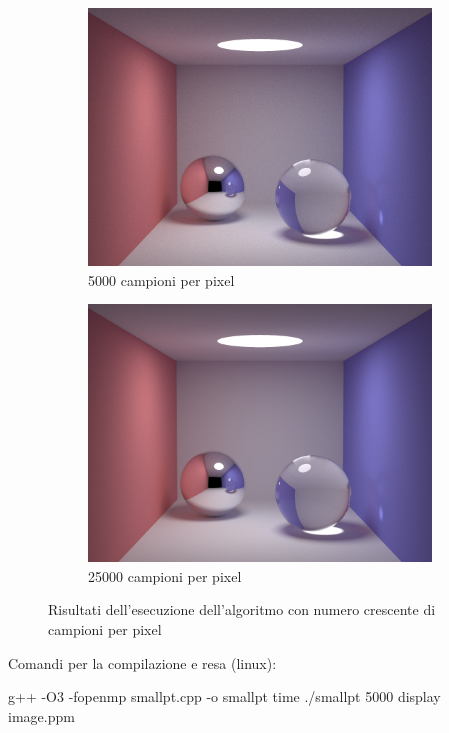 \begin{figure}[tb]
\begin{subfigure}[c]{0.4\linewidth}
	\includegraphics[width=\linewidth]{../assets/appendixD_result_5k.png}
	\caption{5000 campioni per pixel}
    \end{subfigure}\hfill
    \begin{subfigure}[c]{0.4\linewidth}
	\centering
	\includegraphics[width=\linewidth]{../assets/appendixD_result_25k.png}
	\caption{25000 campioni per pixel}
    \end{subfigure}
    \caption{Risultati dell'esecuzione dell'algoritmo con numero crescente di campioni per pixel}
\end{figure}
Comandi per la compilazione e resa (linux):
\begin{verbatim*}
g++ -O3 -fopenmp smallpt.cpp -o smallpt 
time ./smallpt 5000
display image.ppm
\end{verbatim*}
